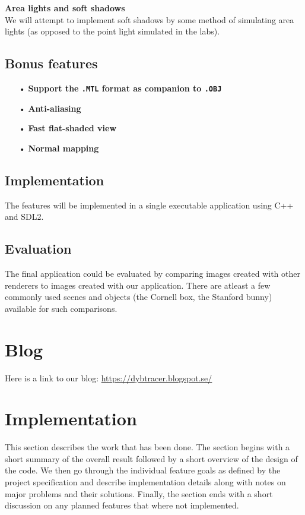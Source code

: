 \documentclass[a4paper,11pt]{article}
\begin{document}
\noindent \textbf{Area lights and soft shadows}\\
We will attempt to implement soft shadows by some method of simulating area lights (as
opposed to the point light simulated in the labs).

\subsection{Bonus features}
\vspace{-.3cm}
\begin{itemize}
\item[•] \textbf{Support the \texttt{.MTL} format as companion to \texttt{.OBJ}}
\vspace{-0.3cm}
\item[•] \textbf{Anti-aliasing}
\vspace{-0.3cm}
\item[•] \textbf{Fast flat-shaded view}
\vspace{-0.3cm}
\item[•] \textbf{Normal mapping}
\end{itemize}

\subsection{Implementation}
The features will be implemented in a single executable application using C++ and SDL2.

\subsection{Evaluation}
The final application could be evaluated by comparing images created with other renderers to
images created with our application. There are atleast a few commonly used
scenes and objects (the Cornell box, the Stanford bunny) available for such comparisons.

\section{Blog}
Here is a link to our blog: \url{https://dybtracer.blogspot.se/}

\newpage
\section{Implementation}
This section describes the work that has been done. The section
begins with a short summary of the overall result followed by a short overview of the design
of the code. We then go through the individual feature goals as defined by the project
specification and describe implementation details along with notes on major problems and
their solutions. Finally, the section ends with a short discussion on any planned features
that where not implemented.
\end{document}
